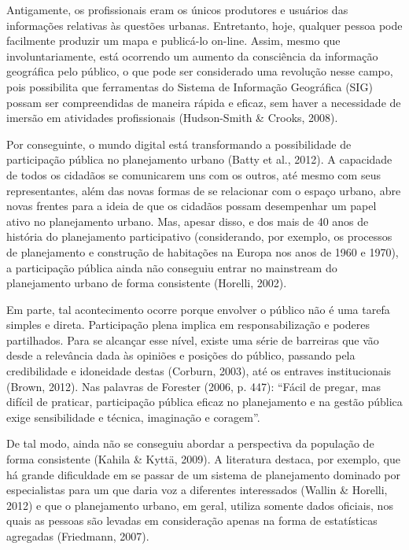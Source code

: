 \documentclass{article}
\begin{document}
Antigamente, os profissionais eram os únicos produtores e usuários das
informações
relativas às questões urbanas. Entretanto, hoje, qualquer pessoa pode facilmente
produzir um mapa e publicá-lo on-line. Assim, mesmo que involuntariamente, está
ocorrendo um aumento da consciência da informação geográfica pelo público, o que
pode ser considerado uma revolução nesse campo, pois possibilita que ferramentas
do
Sistema de Informação Geográfica (SIG) possam ser compreendidas de maneira
rápida e
eficaz, sem haver a necessidade de imersão em atividades profissionais
(Hudson-Smith \& Crooks, 2008).

Por conseguinte, o mundo digital está transformando a possibilidade de
participação
pública no planejamento urbano (Batty et al.,
2012). A capacidade de todos os cidadãos se comunicarem uns com os
outros, até mesmo com seus representantes, além das novas formas de se
relacionar
com o espaço urbano, abre novas frentes para a ideia de que os cidadãos possam
desempenhar um papel ativo no planejamento urbano. Mas, apesar disso, e dos mais
de
40 anos de história do planejamento participativo (considerando, por exemplo, os
processos de planejamento e construção de habitações na Europa nos anos de 1960
e
1970), a participação pública ainda não conseguiu entrar no
mainstream do planejamento urbano de forma consistente (Horelli, 2002).

Em parte, tal acontecimento ocorre porque envolver o público não é uma tarefa
simples
e direta. Participação plena implica em responsabilização e poderes partilhados.
Para se alcançar esse nível, existe uma série de barreiras que vão desde a
relevância dada às opiniões e posições do público, passando pela credibilidade e
idoneidade destas (Corburn, 2003), até os
entraves institucionais (Brown, 2012). Nas
palavras de Forester (2006, p. 447): “Fácil
de pregar, mas difícil de praticar, participação pública eficaz no planejamento
e na
gestão pública exige sensibilidade e técnica, imaginação e coragem”.

De tal modo, ainda não se conseguiu abordar a perspectiva da população de forma
consistente (Kahila \& Kyttä, 2009). A
literatura destaca, por exemplo, que há grande dificuldade em se passar de um
sistema de planejamento dominado por especialistas para um que daria voz a
diferentes interessados (Wallin \& Horelli,
2012) e que o planejamento urbano, em geral, utiliza somente dados
oficiais, nos quais as pessoas são levadas em consideração apenas na forma de
estatísticas agregadas (Friedmann,
2007).
\end{document}
